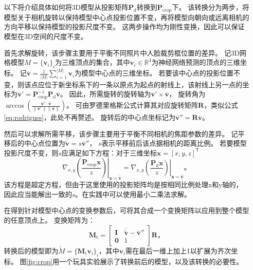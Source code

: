 以下将介绍具体如何将3D模型从投影矩阵$\mathbf{P}_\mathrm{d}$转换到$\mathbf{P}_\mathrm{crop}$下。
该转换分为两步，将模型关于相机旋转以保持模型中心点投影位置不变，再将模型向朝向或远离相机的方向平移以保持模型的投影尺度不变。
这两步操作均为刚性变换，因此可以保证模型在3D空间的尺度不变。

首先求解旋转，该步骤主要用于平衡不同照片中人脸裁剪框位置的差异。
记3D网格模型$M=\{\mathbf{v}_i\}_i$为三维顶点的集合，其中$\mathbf{v}_i\in\mathbb{R}^3$为神经网络预测的顶点的三维坐标。
记$\bar{\mathbf{v}} = \frac{1}{|M|}\sum_{i=1}^{|M|}\mathbf{v}_i$为模型中心点的三维坐标。
若要该中心点的投影位置不变，则该点应位于新坐标系下的一条以原点为起点的射线上，该射线上另一点的坐标为$\bar{\mathbf{v}}' = \mathbf{P}_\mathrm{crop}^{-1}\mathbf{P}_\mathrm{d}\bar{\mathbf{v}}$。
因此，所需旋转的旋转轴为$\bar{\mathbf{v}}' \times \bar{\mathbf{v}}$，
旋转角为$\arccos\left(\frac{\bar{\mathbf{v}}'\cdot\bar{\mathbf{v}}}{\|\bar{\mathbf{v}}'\|\|\bar{\mathbf{v}}\|}\right)$。
可由罗德里格斯公式计算其对应旋转矩阵$\mathbf{R}$，类似公式\ref{eq:rodrigues}，此处不再赘述。
旋转后的中心点坐标记为$\bar{\mathbf{v}}'' = \mathbf{R}\bar{\mathbf{v}}$。

然后可以求解所需平移，该步骤主要用于平衡不同相机的焦距参数的差异。
记平移后的中心点位置为$\bar{\tilde{\mathbf{v}}} = s\bar{\mathbf{v}}''$，
$s$表示平移前后该点据相机的距离比例。
若要模型投影尺度不变，则$s$应满足如下方程：对于三维坐标$\mathbf{x}=[x,y,z]^\mathsf{T}$
\begin{equation}
    \left.\nabla_{x,y}\left(\frac{\mathbf{P}_\mathrm{crop}\mathbf{x}}{z}\right)\right|_{\mathbf{x}=\bar{\tilde{\mathbf{v}}}} =
    \left.\nabla_{x,y}\left(\frac{\mathbf{P}_\mathrm{d}\mathbf{x}}{z}\right)\right|_{\mathbf{x}=\bar{\mathbf{v}}}
    \text{。}
\end{equation}
该方程是超定方程，但由于这里使用的投影矩阵均是按相同比例处理x和y轴的，因此应当能解出一致的$s$。在实践中可以使用最小二乘法求解。

在得到针对模型中心点的变换参数后，可将其合成一个变换矩阵以应用到整个模型的任意顶点上。
变换矩阵为：
\begin{equation}
    \mathbf{M}_\mathrm{t} = \begin{bmatrix}
        \mathbf{I} & \bar{\tilde{\mathbf{v}}} - \bar{\mathbf{v}}'' \\
        \mathbf{0} & 1
    \end{bmatrix}\mathbf{R}
    \text{，}
\end{equation}
转换后的模型即为$\tilde{M}=\{\mathbf{M}_\mathrm{t}\mathbf{v}_i\}_i$，其中$\mathbf{v}_i$需在最后一维上加上1以扩展为齐次坐标。
图\ref{fig:crop}用一个玩具实验展示了转换前后的模型，以及该转换的必要性。

